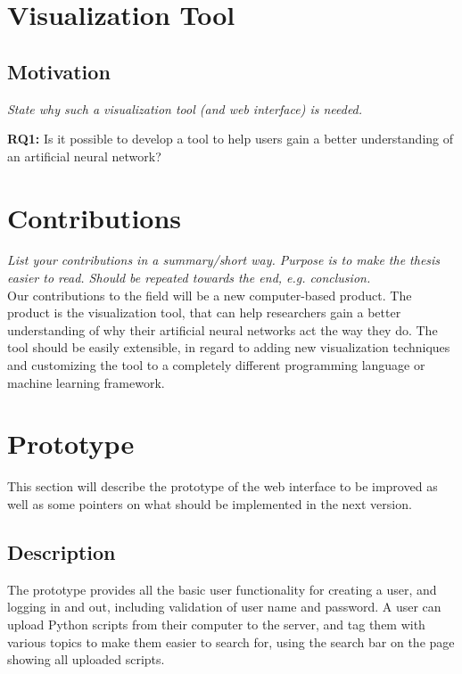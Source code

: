 \section{Visualization Tool}

\subsection{Motivation}

\textit{State why such a visualization tool (and web interface) is needed.}

\noindent\textbf{RQ1:} Is it possible to develop a tool to help users gain a better understanding of an artificial neural network?

\section{Contributions}

\textit{List your contributions in a summary/short way. Purpose is to make the thesis easier to read. Should be repeated towards the end, e.g. conclusion.} \\

\noindent Our contributions to the field will be a new computer-based product. The product is the visualization tool, that can help researchers gain a better understanding of why their artificial neural networks act the way they do. The tool should be easily extensible, in regard to adding new visualization techniques and customizing the tool to a completely different programming language or machine learning framework.

\section{Prototype}

This section will describe the prototype of the web interface to be improved as well as some pointers on what should be implemented in the next version.

\subsection{Description}

\noindent The prototype provides all the basic user functionality for creating a user, and logging in and out, including validation of user name and password. A user can upload Python scripts from their computer to the server, and tag them with various topics to make them easier to search for, using the search bar on the page showing all uploaded scripts. \\

